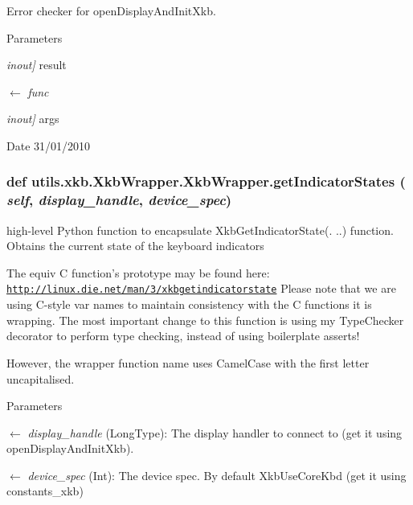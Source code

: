 Error checker for openDisplayAndInitXkb. 
\begin{DoxyParams}{Parameters}
\item[{\em inout\mbox{]}}]result \item[\mbox{$\leftarrow$} {\em func}]\item[{\em inout\mbox{]}}]args \end{DoxyParams}
\begin{DoxyDate}{Date}
31/01/2010 
\end{DoxyDate}
\hypertarget{classutils_1_1xkb_1_1XkbWrapper_1_1XkbWrapper_a291c5d4f5587b13cc04f57ad7c3b57b8}{
\subsubsection[{getIndicatorStates}]{\setlength{\rightskip}{0pt plus 5cm}def utils.xkb.XkbWrapper.XkbWrapper.getIndicatorStates ( {\em self}, \/   {\em display\_\-handle}, \/   {\em device\_\-spec})}}
\label{classutils_1_1xkb_1_1XkbWrapper_1_1XkbWrapper_a291c5d4f5587b13cc04f57ad7c3b57b8}


high-\/level Python function to encapsulate XkbGetIndicatorState(. ..) function. Obtains the current state of the keyboard indicators

The equiv C function's prototype may be found here: \href{http://linux.die.net/man/3/xkbgetindicatorstate}{\tt http://linux.die.net/man/3/xkbgetindicatorstate} Please note that we are using C-\/style var names to maintain consistency with the C functions it is wrapping. The most important change to this function is using my TypeChecker decorator to perform type checking, instead of using boilerplate asserts!

However, the wrapper function name uses CamelCase with the first letter uncapitalised.


\begin{DoxyParams}{Parameters}
\item[\mbox{$\leftarrow$} {\em display\_\-handle}](LongType): The display handler to connect to (get it using openDisplayAndInitXkb). \item[\mbox{$\leftarrow$} {\em device\_\-spec}](Int): The device spec. By default XkbUseCoreKbd (get it using constants\_\-xkb) \end{DoxyParams}

